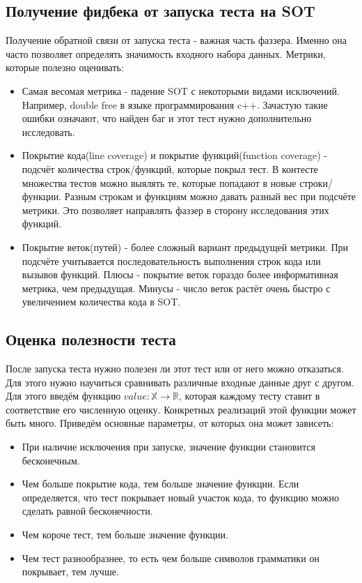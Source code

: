 \documentclass[a4paper]{article}
\begin{document}
\subsection{Получение фидбека от запуска теста на SOT}
\indent

Получение обратной связи от запуска теста - важная часть фаззера. Именно она часто позволяет определять значимость входного набора данных. Метрики, которые полезно оценивать:

\begin{itemize}
\item Самая весомая метрика - падение SOT с некоторыми видами исключений. Например, double free в языке программирования c++. Зачастую такие ошибки означают, что найден баг и этот тест нужно дополнительно исследовать.
\item Покрытие кода(line coverage) и покрытие функций(function coverage) - подсчёт количества строк/функций, которые покрыл тест. В контесте множества тестов можно выялять те, которые попадают в новые строки/функции. Разным строкам и функциям можно давать разный вес при подсчёте метрики. Это позволяет направлять фаззер в сторону исследования этих функций.
\item Покрытие веток(путей) - более сложный вариант предыдущей метрики. При подсчёте учитывается последовательность выполнения строк кода или вызывов функций. Плюсы - покрытие веток гораздо более информативная метрика, чем предыдущая. Минусы - число веток растёт очень быстро с увеличением количества кода в SOT.
\end{itemize}

\subsection{Оценка полезности теста}
\indent

После запуска теста нужно полезен ли этот тест или от него можно отказаться. Для этого нужно научиться сравнивать различные входные данные друг с другом.
Для этого введём функцию $value : \mathbb {X} \rightarrow \mathbb {R}$, которая каждому тесту ставит в соответствие его численную оценку. Конкретных реализаций этой функции может быть много. Приведём основные параметры, от которых она может зависеть:
\begin{itemize}
    \item При наличие исключения при запуске, значение функции становится бесконечным.
    \item Чем больше покрытие кода, тем больше значение функции. Если определяется, что тест покрывает новый участок кода, то функцию можно сделать равной бесконечности.
    \item Чем короче тест, тем больше значение функции.
    \item Чем тест разнообразнее, то есть чем больше символов грамматики он покрывает, тем лучше.
\end{itemize}
\end{document}
